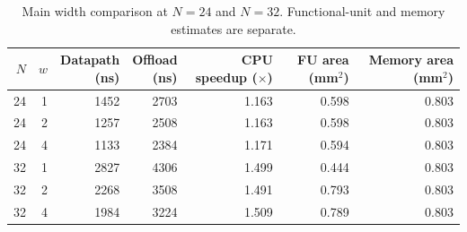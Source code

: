 \begin{table}[!t]
\centering
\caption{Main width comparison at $N=24$ and $N=32$. Functional-unit and memory estimates are separate.}
\label{tab:width}
\footnotesize
\setlength{\tabcolsep}{4pt}
\begin{tabular}{rrrrrrr}\toprule
$N$ & $w$ & \shortstack{Datapath\\(ns)} & \shortstack{Offload\\(ns)} & \shortstack{CPU speedup\\($\times$)} & \shortstack{FU area\\(mm$^2$)} & \shortstack{Memory area\\(mm$^2$)} \\ \midrule
24 & 1 & 1452 & 2703 & 1.163 & 0.598 & 0.803 \\
24 & 2 & 1257 & 2508 & 1.163 & 0.598 & 0.803 \\
24 & 4 & 1133 & 2384 & 1.171 & 0.594 & 0.803 \\
32 & 1 & 2827 & 4306 & 1.499 & 0.444 & 0.803 \\
32 & 2 & 2268 & 3508 & 1.491 & 0.793 & 0.803 \\
32 & 4 & 1984 & 3224 & 1.509 & 0.789 & 0.803 \\
\bottomrule
\end{tabular}
\end{table}
